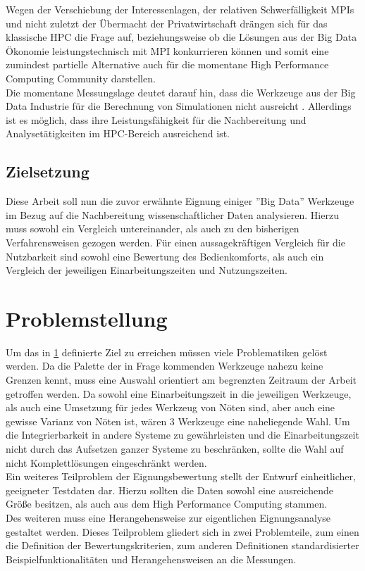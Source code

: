 \documentclass[
	12pt,
	a4paper,
	BCOR10mm,
	DIV14,
	listof=totoc,
	bibliography=totoc,
	headsepline
]{scrreprt}
\begin{document}
Wegen der Verschiebung der Interessenlagen, der relativen Schwerfälligkeit MPIs und nicht zuletzt der Übermacht der Privatwirtschaft drängen sich für das klassische HPC die Frage auf, beziehungsweise ob die Lösungen aus der Big Data Ökonomie leistungstechnisch mit MPI konkurrieren können und somit eine zumindest partielle Alternative auch für die momentane High Performance Computing Community darstellen.\\
Die momentane Messungslage deutet darauf hin, dass die Werkzeuge aus der Big Data Industrie für die Berechnung von Simulationen nicht ausreicht \cite{HLR}.
Allerdings ist es möglich, dass ihre Leistungsfähigkeit für die Nachbereitung und Analysetätigkeiten im HPC-Bereich ausreichend ist. \\
\FloatBarrier

\section{Zielsetzung}
\label{ziel}
Diese Arbeit soll nun die zuvor erwähnte Eignung einiger ''Big Data'' Werkzeuge im Bezug auf die Nachbereitung wissenschaftlicher Daten analysieren.
Hierzu muss sowohl ein Vergleich untereinander, als auch zu den bisherigen Verfahrensweisen gezogen werden.
Für einen aussagekräftigen Vergleich für die Nutzbarkeit sind sowohl eine Bewertung des Bedienkomforts, als auch ein Vergleich der jeweiligen Einarbeitungszeiten und Nutzungszeiten.


\chapter{Problemstellung}
\label{Problemstellung}
Um das in \ref{ziel} definierte Ziel zu erreichen müssen viele Problematiken gelöst werden.
Da die Palette der in Frage kommenden Werkzeuge nahezu keine Grenzen kennt, muss eine Auswahl orientiert am begrenzten Zeitraum der Arbeit getroffen werden.
Da sowohl eine Einarbeitungszeit in die jeweiligen Werkzeuge, als auch eine Umsetzung für jedes Werkzeug von Nöten sind, aber auch eine gewisse Varianz von Nöten ist, wären 3 Werkzeuge eine naheliegende Wahl. 
Um die Integrierbarkeit in andere Systeme zu gewährleisten und die Einarbeitungszeit nicht durch das Aufsetzen ganzer Systeme zu beschränken, sollte die Wahl auf nicht Komplettlösungen eingeschränkt werden. \\
Ein weiteres Teilproblem der Eignungsbewertung stellt der Entwurf einheitlicher, geeigneter Testdaten dar.
Hierzu sollten die Daten sowohl eine ausreichende Größe besitzen, als auch aus dem High Performance Computing stammen. \\
Des weiteren muss eine Herangehensweise zur eigentlichen Eignungsanalyse gestaltet werden. 
Dieses Teilproblem gliedert sich in zwei Problemteile, zum einen die Definition der Bewertungskriterien, zum anderen Definitionen standardisierter Beispielfunktionalitäten und Herangehensweisen an die Messungen.
\end{document}
